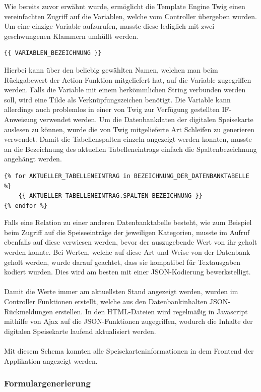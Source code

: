 Wie bereits zuvor erwähnt wurde, ermöglicht die Template Engine Twig einen vereinfachten Zugriff auf die Variablen, welche vom Controller übergeben wurden. Um eine einzige Variable aufzurufen, musste diese lediglich mit zwei geschwungenen Klammern umhüllt werden. 
\lstset{language = php}
  	\begin{lstlisting}
{{ VARIABLEN_BEZEICHNUNG }}
\end{lstlisting}
Hierbei kann über den beliebig gewählten Namen, welchen man beim Rückgabewert der Action-Funktion mitgeliefert hat, auf die Variable zugegriffen werden. 
Falls die Variable mit einem herkömmlichen String verbunden werden soll, wird eine Tilde als Verknüpfungszeichen benötigt. 
Die Variable kann allerdings auch problemlos in einer von Twig zur Verfügung gestellten IF-Anweisung verwendet werden.
Um die Datenbankdaten der digitalen Speisekarte auslesen zu können, wurde die von Twig mitgelieferte Art Schleifen zu generieren verwendet. Damit die Tabellenspalten einzeln angezeigt werden konnten, musste an die Bezeichnung des aktuellen Tabelleneintrags einfach die Spaltenbezeichnung angehängt werden. 
\lstset{language = php}
  	\begin{lstlisting}
{% for AKTUELLER_TABELLENEINTRAG in BEZEICHNUNG_DER_DATENBANKTABELLE %}
	{{ AKTUELLER_TABELLENEINTRAG.SPALTEN_BEZEICHNUNG }}
{% endfor %}
	\end{lstlisting}
Falls eine Relation zu einer anderen Datenbanktabelle besteht, wie zum Beispiel beim Zugriff auf die Speiseeinträge der jeweiligen Kategorien, musste im Aufruf ebenfalls auf diese verwiesen werden, bevor der auszugebende Wert von ihr geholt werden konnte.
Bei Werten, welche auf diese Art und Weise von der Datenbank geholt werden, wurde darauf geachtet, dass sie kompatibel für Textausgaben kodiert wurden. Dies wird am besten mit einer JSON-Kodierung bewerkstelligt.
\\ \\
Damit die Werte immer am aktuellsten Stand angezeigt werden, wurden im Controller Funktionen erstellt, welche aus den Datenbankinhalten JSON-Rückmeldungen erstellen.
In den HTML-Dateien wird regelmäßig in Javascript mithilfe von Ajax auf die JSON-Funktionen zugegriffen, wodurch die Inhalte der digitalen Speisekarte laufend aktualisiert werden.
\\ \\
Mit diesem Schema konnten alle Speisekarteninformationen in dem Frontend der Applikation angezeigt werden.

    \subsubsection{Formulargenerierung}

